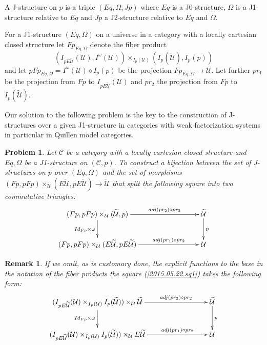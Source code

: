 \documentclass[12pt]{article}
\numberwithin{equation}{section}
\newenvironment{eq}{\begin{equation}}{\end{equation}}
\newtheorem{remark}[proposition]{Remark}
\newtheorem{problem}[proposition]{Problem}
\newcommand{\llabel}[1]{\label{#1}}
\newcommand{\sr}{\rightarrow}
\newcommand{\wt}{\widetilde}
\newcommand{\dd}{\diamond}
\newcommand{\U}{\mathcal{U}}
\begin{document}
A J-structure on $p$ is a triple $(Eq,\Omega,Jp)$ where $Eq$ is a J0-structure,
$\Omega$ is a J1-structure relative to $Eq$ and $Jp$ a J2-structure relative to
$Eq$ and $\Omega$.

For a J1-structure $(Eq,\Omega)$ on a universe in a category with a locally
cartesian closed structure let $Fp_{Eq,\Omega}$ denote the fiber product
%
$$(I_{pE\wt{\U}}(\U), I^{\omega}(\U)) \times_{I_p(\U)} (I_p(\wt{\U}), I_p(p))$$
%
and let $pFp_{Eq,\Omega}=I^{\omega}(\U)\dd I_p(p)$ be the projection
$Fp_{Eq,\Omega}\sr \U$. Let further $pr_1$ be the projection from $Fp$ to
$I_{pE\wt{\U}}(\U)$ and $pr_2$ the projection from $Fp$ to $I_p(\wt{\U})$.

Our solution to the following problem is the key to the construction of
J-structures over a given J1-structure in categories with weak factorization
systems in particular in Quillen model categories.
%
\begin{problem}
\llabel{2015.05.12.l1} Let $\mathcal C$ be a category with a locally cartesian
closed structure and $Eq,\Omega$ be a J1-structure on $({\mathcal C},p)$. To
construct a bijection between the set of J-structures on $p$ over $(Eq,\Omega)$
and the set of morphisms $(Fp,pFp)\times_\U(E\wt{\U},pE\wt{\U})\sr \wt{\U}$ that
split the following square into two commutative triangles:
%
\begin{eq}\llabel{2015.05.22.sq1}
\begin{xy}
          \xymatrix@C=7pc{ (Fp,pFp)\times_\U(\wt{\U},p) \ar[r]^-{adj(pr_2)\circ
              pr_2} \ar[d]_{Id_{Fp}\times \omega} & \wt{\U}
            \ar[d]^{p}\\ (Fp,pFp)\times_\U(E\wt{\U},pE\wt{\U})
            \ar[r]^-{adj(pr_1)\circ pr_2} & \U }
\end{xy}
\end{eq}
%
\end{problem}
%
\begin{remark}\rm
If we omit, as is customary done, the explicit functions to the base in the
notation of the fiber products the square (\ref{2015.05.22.sq1}) takes the
following form:
%
\begin{eq}\llabel{2017.08.16.sq1}
\begin{xy}
          \xymatrix@C=7pc{ (I_{pE\wt{\U}}(\U)\times_{I_p(\U)}
            I_p(\wt{\U}))\times_\U\wt{\U} \ar[r]^-{adj(pr_2)\circ pr_2}
            \ar[d]_{Id_{Fp}\times \omega} & \wt{\U}
            \ar[d]^{p}\\ (I_{pE\wt{\U}}(\U)\times_{I_p(\U)} I_p(\wt{\U}))\times_\U
            E\wt{\U} \ar[r]^-{adj(pr_1)\circ pr_2} & \U }
\end{xy}
\end{eq}




\end{remark}
\end{document}
